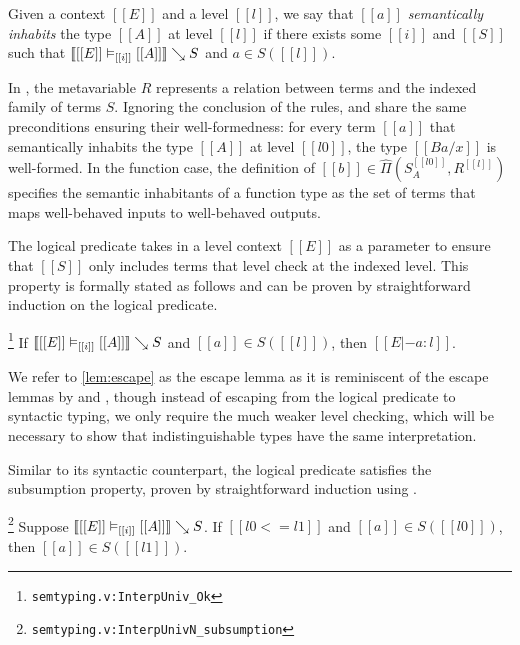 \documentclass[acmsmall, screen=true, nonacm=true,
  review=\ifpublic false\else true\fi,
  anonymous=\ifanonymous true\else false\fi
]{acmart}
\DeclarePairedDelimiter{\bracks}{\llbracket}{\rrbracket}
\newcommand{\suppl}[3]{{\scriptsize\texttt{#2:#3}}}
\newcommand{\interp}[4]{\bracks{#1 \vDash_{#2} #3} \searrow #4}
\newcommand{\member}[3]{#1 \in #3(#2)}
\newcommand{\prodspace}[5]{#1 \in \hat{\Pi}(#2^{#3}, #4^{#5})}
\newlength{\punctwidth}
\newcommand{\stack}[1]{%
  \settowidth{\punctwidth}{#1}%
  \hspace*{-\the\punctwidth}%
}
\begin{document}
\begin{definition}
  Given a context $[[E]]$ and a level $[[l]]$, 
  we say that $[[a]]$ \emph{semantically inhabits} the type $[[A]]$
  at level $[[l]]$ if there exists some $[[i]]$ and $[[S]]$ such that
  $\interp{[[E]]}{[[i]]}{[[A]]}{S}$ and $\member{a}{[[l]]}{S}$.
\end{definition}

In , the
metavariable $R$ represents a relation between terms and the
indexed family of terms $S$. Ignoring the conclusion of the rules, 
 and  share the same preconditions
ensuring their well-formedness:
for every term $[[a]]$ that semantically inhabits the type $[[A]]$ at
level $[[l0]]$, the type $[[B {a / x}]]$ is well-formed.
In the function case, the definition of $\prodspace{[[b]]}{S_A}{[[l0]]}{R}{[[l]]}$
specifies the semantic inhabitants of a function type as the set of
terms that maps well-behaved inputs to well-behaved outputs.

The logical predicate takes in a level context $[[E]]$ as a
parameter to ensure that $[[S]]$ only includes terms that level check
at the indexed level.
This property is
formally stated as follows and can be proven by straightforward
induction on the logical predicate.

\begin{lemma}[Escape]
  \stack{.~}\footnote{\suppl{theories}{semtyping.v}{InterpUniv\_Ok}}
  \label{lem:escape}
  If $\interp{[[E]]}{[[i]]}{[[A]]}{S}$ and $\member{[[a]]}{[[l]]}{S}$,
  then $[[E |- a : l]]$.
\end{lemma}

We refer to \cref{lem:escape} as the escape lemma as it is
reminiscent of the escape lemmas by \citet{abel:irrelevance} and
\citet{adjedj:mltt-coq}, though instead of escaping from the
logical predicate to syntactic typing, we only require
the much weaker level checking,
which will be necessary to show that indistinguishable
types have the same interpretation.

Similar to its syntactic counterpart, the logical predicate satisfies
the subsumption property,
proven by straightforward induction using .

\begin{lemma}
  \stack{.~}\footnote{\suppl{theories}{semtyping.v}{InterpUnivN\_subsumption}}
  Suppose $\interp{[[E]]}{[[i]]}{[[A]]}{S}$.
  If $[[l0 <= l1]]$ and $\member{[[a]]}{[[l0]]}{S}$,
  then $\member{[[a]]}{[[l1]]}{S}$.
\end{lemma}
\end{document}
